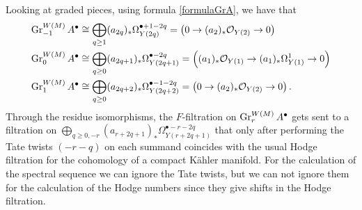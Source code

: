 \documentclass[../main.tex]{subfiles}
\begin{document}
\begin{es}
Looking at graded pieces, using formula \eqref{formulaGrA}, we have that
\begin{align*}
    \operatorname{Gr}^{W(M)}_{-1} A^\bullet &\cong \bigoplus_{q \geq 1} (a_{2q})_* \Omega_{Y(2q)}^{\bullet+1-2q} = \left( 0 \to (a_2)_*\mathcal{O}_{Y(2)}  \to 0 \right) \\
\operatorname{Gr}^{W(M)}_{0} A^\bullet &\cong \bigoplus_{q \geq 0} (a_{2q+1})_* \Omega_{Y(2q+1)}^{\bullet-2q} = \left( (a_1)_*\mathcal{O}_{Y(1)} \to (a_1)_*\Omega^1_{Y(1)}  \to 0  \right) \\ 
\operatorname{Gr}^{W(M)}_{1} A^\bullet &\cong \bigoplus_{q \geq 0} (a_{2q+2})_* \Omega_{Y(2q+2)}^{\bullet-1-2q} = \left( 0 \to (a_2)_*\mathcal{O}_{Y(2)} \to 0 \right). \\
\end{align*}
Through the residue isomorphisms, the $F$-filtration on $\operatorname{Gr}^{W(M)}_{r} A^\bullet$ gets sent to a filtration on $ \bigoplus_{q \geq0,-r}(a_{r+2q+1})_* \Omega^{\bullet-r-2q}_{Y(r+2q+1)}$ that only after performing the Tate twists $(-r-q)$ on each summand coincides with the usual Hodge filtration for the cohomology of a compact K\"{a}hler manifold.
For the calculation of the spectral sequence we can ignore the Tate twists, but we can not ignore them for the calculation of the Hodge numbers since they give shifts in the Hodge filtration.


\end{es}
\end{document}
